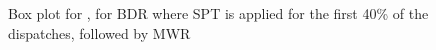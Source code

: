 \begin{figure}
\centering
{}
\caption{Box plot for \namerho, for BDR where SPT is applied for the first 40\% of the dispatches, followed by MWR}
\label{fig:diff:boxplot:BDR}
\end{figure}


\begin{comment}
\subsection{Extremal feature}\label{sec:diff:opt:ext}
The SDRs we've inspected so-far are based on two features from \cref{tbl:features}, namely
\begin{itemize}
\item \phiproc\ for SPT and LPT 
\item \phiwrmJob\ for LWR and MWR 
\end{itemize}
by choosing the lowest value for the first SDR, and highest value for the latter SDR, i.e., the extremal values for those given features. Let's apply the same methodology from \cref{sec:diff:opt:sdr} to all varying features\footnote{Note, \phistep, \phimac\ and \phiwrmTotal\ describe the features, not the schedule. For instance, \phistep\, gives us no new information, as that feature is homogeneous for each timestep, making it equivalent to random guessing.} described in \cref{tbl:jssp:feat}.  \Cref{fig:diff:j.rnd:opt:minmax,fig:diff:j.rndn:opt:minmax,fig:diff:f.rnd:opt:minmax}
depict the probability of all extremal features being an optimal dispatch, with random guessing from \cref{fig:diff:opt} as a dashed line. 

In order to put the extremal features into perspective, it's worth comparing them with how the evolution of the features are over time, depicted in \cref{fig:diff:j.rnd:opt:evol,fig:diff:j.rndn:opt:evol,fig:diff:f.rnd:opt:evol}. 


\begin{figure}
\centering
\texttt{[image: figures/\{j.rnd]}/{trdat.feat.stepwise.10x10.OPT}.pdf}
\caption{Feature evolution of optimal trajectory for \jrnd}
\label{fig:diff:j.rnd:opt:evol}
\end{figure}
\begin{figure}
\centering
\missingfigure{j.rndn}
\caption{Feature evolution of optimal trajectory for \jrndn}
\label{fig:diff:j.rndn:opt:evol}
\end{figure}
\begin{figure}
\centering
\texttt{[image: figures/\{f.rnd]}/{trdat.feat.stepwise.10x10.OPT}.pdf}
\caption{Feature evolution of optimal trajectory for \frnd{10}{10}}
\label{fig:diff:f.rnd:opt:evol}
\end{figure}


\end{comment}

